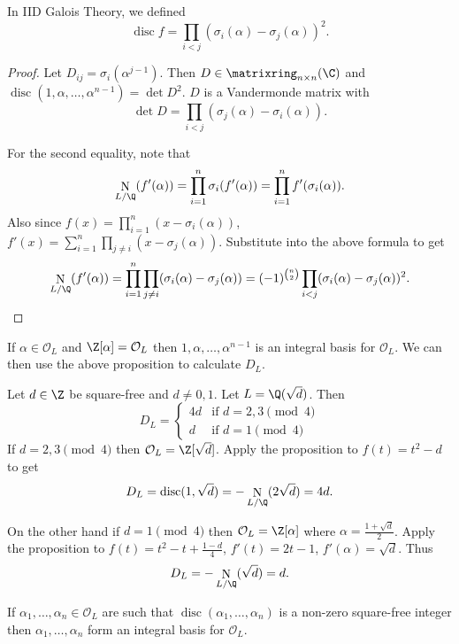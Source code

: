 \documentclass[a4paper]{article}
\renewcommand*{\O}{\mathcal{O}}
\DeclareMathOperator{\n}{N}
\DeclareMathOperator{\disc}{disc}
\begin{document}
\begin{note}
  In IID Galois Theory, we defined
  \[
    \disc f = \prod_{i < j} (\sigma_i(\alpha) - \sigma_j(\alpha))^2.
  \]
\end{note}

\begin{proof}
  Let \(D_{ij} = \sigma_i(\alpha^{j - 1})\). Then \(D \in \matrixring_{n \times n}(\C)\) and \(\disc(1, \alpha, \dots, \alpha^{n -1}) = \det D^2\). \(D\) is a Vandermonde matrix with
  \[
    \det D = \prod_{i < j} (\sigma_j(\alpha) - \sigma_i(\alpha)).
  \]

  For the second equality, note that
  \[
    \n_{L/\Q}(f'(\alpha))
    = \prod_{i = 1}^n \sigma_i(f'(\alpha))
    = \prod_{i = 1}^n f'(\sigma_i(\alpha)).
  \]
  Also since \(f(x) = \prod_{i = 1}^n (x - \sigma_i(\alpha))\), \(f'(x) = \sum_{i = 1}^n\prod_{j \neq i} (x - \sigma_j(\alpha))\). Substitute into the above formula to get
  \[
    \n_{L/\Q}(f'(\alpha))
    = \prod_{i = 1}^n \prod_{j \neq i} (\sigma_i(\alpha) - \sigma_j(\alpha))
    = (-1)^{\binom{n}{2}} \prod_{i < j}(\sigma_i(\alpha) - \sigma_j(\alpha))^2.
  \]
\end{proof}

\begin{note}
  If \(\alpha \in \O_L\) and \(\Z[\alpha] = \O_L\) then \(1, \alpha, \dots, \alpha^{n -1}\) is an integral basis for \(\O_L\). We can then use the above proposition to calculate \(D_L\).
\end{note}

\begin{eg}
  Let \(d \in \Z\) be square-free and \(d \neq 0, 1\). Let \(L = \Q(\sqrt d)\). Then
  \[
    D_L =
    \begin{cases}
      4d & \text{if } d = 2, 3 \pmod 4 \\
      d & \text{if } d = 1 \pmod 4
    \end{cases}
  \]
  If \(d = 2, 3 \pmod 4\) then \(\O_L = \Z[\sqrt d]\). Apply the proposition to \(f(t) = t^2 - d\) to get
  \[
    D_L = \disc(1, \sqrt d) = -\n_{L/\Q}(2\sqrt d) = 4d.
  \]

  On the other hand if \(d = 1 \pmod 4\) then \(\O_L = \Z[\alpha]\) where \(\alpha  = \frac{1 + \sqrt d}{2}\). Apply the proposition to \(f(t) = t^2 - t + \frac{1 - d}{4}\), \(f'(t) = 2t - 1\), \(f'(\alpha) = \sqrt d\). Thus
  \[
    D_L = -\n_{L/\Q}(\sqrt d) = d.
  \]
\end{eg}

\begin{proposition}
  If \(\alpha_1, \dots, \alpha_n \in \O_L\) are such that \(\disc(\alpha_1, \dots, \alpha_n)\) is a non-zero square-free integer then \(\alpha_1, \dots, \alpha_n\) form an integral basis for \(\O_L\).
\end{proposition}
\end{document}
